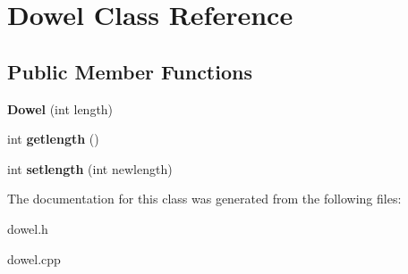 \hypertarget{classDowel}{\section{Dowel Class Reference}
\label{classDowel}
}
\subsection*{Public Member Functions}
\begin{DoxyCompactItemize}
\item 
\hypertarget{classDowel_a964757578119adbd7a06e226ca7eab45}{{\bfseries Dowel} (int length)}\label{classDowel_a964757578119adbd7a06e226ca7eab45}

\item 
\hypertarget{classDowel_a9136bf1349d168f6105ecba78dc2ce39}{int {\bfseries getlength} ()}\label{classDowel_a9136bf1349d168f6105ecba78dc2ce39}

\item 
\hypertarget{classDowel_a80188d0af7600515d281155083c9d801}{int {\bfseries setlength} (int newlength)}\label{classDowel_a80188d0af7600515d281155083c9d801}

\end{DoxyCompactItemize}


The documentation for this class was generated from the following files\-:\begin{DoxyCompactItemize}
\item 
dowel.\-h\item 
dowel.\-cpp\end{DoxyCompactItemize}
